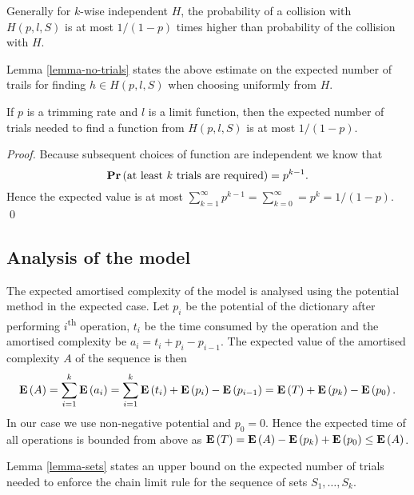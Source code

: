 Generally for $k$-wise independent $H$, the probability of a collision with $H(p, l, S)$ is at most $1 / (1 - p)$ times higher than probability of the collision with $H$.

Lemma \ref{lemma-no-trials} states the above estimate on the expected number of trails for finding $h \in H(p, l, S)$ when choosing uniformly from $H$.

\begin{lemma}
\label{lemma-no-trials}
If $p$ is a trimming rate and $l$ is a limit function, then the expected number of trials needed to find a function from $H(p, l, S)$ is at most ${1}/{(1 - p)}$.
\end{lemma}
\begin{proof}
Because subsequent choices of function are independent we know that \[\mathbf{Pr}\left(\mbox{at least }k\mbox{ trials are required}\right) = p^{k - 1}.\]
Hence the expected value is at most $\sum_{k = 1}^{\infty} p^{k - 1} = \sum_{k = 0}^{\infty} = p^k = {1}/{(1 - p)}.$
\qed
\end{proof}

\subsection{Analysis of the model}
The expected amortised complexity of the model is analysed using the potential method in the expected case. Let $p_i$ be the potential of the dictionary after performing $i$\textsuperscript{th} operation, $t_i$ be the time consumed by the operation and the amortised complexity be $a_i = t_i + p_i - p_{i - 1}$. The expected value of the amortised complexity $A$ of the sequence is then
\[
\mathbf{E}\left(A\right) = \sum_{i=1}^{k} \mathbf{E}\left(a_i\right) = \sum_{i = 1}^{k} \mathbf{E}\left(t_i\right) + \mathbf{E}\left(p_i\right) - \mathbf{E}\left(p_{i - 1}\right) = \mathbf{E}\left(T\right) + \mathbf{E}\left(p_k\right) - \mathbf{E}\left(p_0\right).
\]
In our case we use non-negative potential and $p_0 = 0$. Hence the expected time of all operations is bounded from above as $\mathbf{E}\left(T\right) = \mathbf{E}\left(A\right) - \mathbf{E}\left(p_k\right) + \mathbf{E}\left(p_0\right) \leq \mathbf{E}\left(A\right)$.


Lemma \ref{lemma-sets} states an upper bound on the expected number of trials needed to enforce the chain limit rule for the sequence of sets $S_1, \dots, S_k$.

